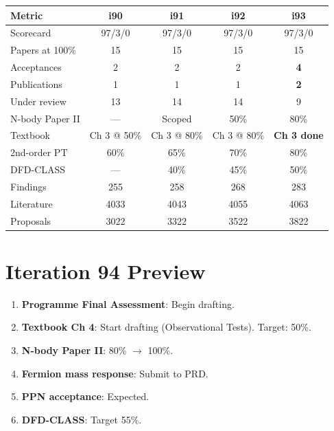 \documentclass[11pt,a4paper]{article}
\begin{document}
\begin{center}
\begin{tabular}{lcccc}
\toprule
\textbf{Metric} & \textbf{i90} & \textbf{i91} & \textbf{i92} & \textbf{i93} \\
\midrule
Scorecard & 97/3/0 & 97/3/0 & 97/3/0 & 97/3/0 \\
Papers at 100\% & 15 & 15 & 15 & 15 \\
Acceptances & 2 & 2 & 2 & \textbf{4} \\
Publications & 1 & 1 & 1 & \textbf{2} \\
Under review & 13 & 14 & 14 & 9 \\
N-body Paper II & --- & Scoped & 50\% & 80\% \\
Textbook & Ch 3 @ 50\% & Ch 3 @ 80\% & Ch 3 @ 80\% & \textbf{Ch 3 done} \\
2nd-order PT & 60\% & 65\% & 70\% & 80\% \\
DFD-CLASS & --- & 40\% & 45\% & 50\% \\
Findings & 255 & 258 & 268 & 283 \\
Literature & 4033 & 4043 & 4055 & 4063 \\
Proposals & 3022 & 3322 & 3522 & 3822 \\
\bottomrule
\end{tabular}
\end{center}

\section{Iteration 94 Preview}

\begin{tcolorbox}[colback=blue!5!white, colframe=dfdblue, title=\textbf{i94 Targets}]
\begin{enumerate}[nosep]
\item \textbf{Programme Final Assessment}: Begin drafting.
\item \textbf{Textbook Ch 4}: Start drafting (Observational Tests). Target: 50\%.
\item \textbf{N-body Paper II}: 80\% $\to$ 100\%.
\item \textbf{Fermion mass response}: Submit to PRD.
\item \textbf{PPN acceptance}: Expected.
\item \textbf{DFD-CLASS}: Target 55\%.
\end{enumerate}
\end{tcolorbox}
\end{document}
